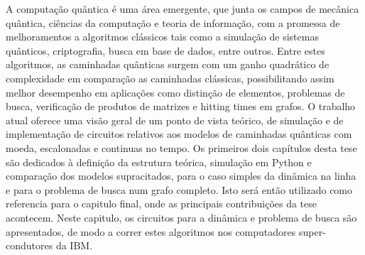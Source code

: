 \documentclass[../../dissertation.tex]{subfiles}
\begin{document}
A computação quântica é uma área emergente, que junta os campos de mecânica
quântica, ciências da computação e teoria de informação, com a promessa de
melhoramentos a algoritmos clássicos tais como a simulação de sistemas
quânticos, criptografia, busca em base de dados, entre outros. Entre estes
algoritmos, as caminhadas quânticas surgem com um ganho quadrático de
complexidade em comparação as caminhadas clássicas, possibilitando assim melhor
desempenho em aplicações como distinção de elementos, problemas de busca,
verificação de produtos de matrizes e hitting times em grafos. O trabalho atual
oferece uma visão geral de um ponto de vista teórico, de simulação e de
implementação de circuitos relativos aos modelos de caminhadas quânticas com
moeda, escalonadas e continuas no tempo. Os primeiros dois capítulos desta tese
são dedicados à definição da estrutura teórica, simulação em Python e
comparação dos modelos supracitados, para o caso simples da
dinâmica na linha e para o problema de busca num grafo completo. Isto será
então utilizado como referencia para o capitulo final, onde as principais
contribuições da tese acontecem. Neste capitulo, os circuitos para a dinâmica e
problema de busca são apresentados, de modo a correr estes algoritmos nos
computadores super-condutores da IBM. 
\end{document}
